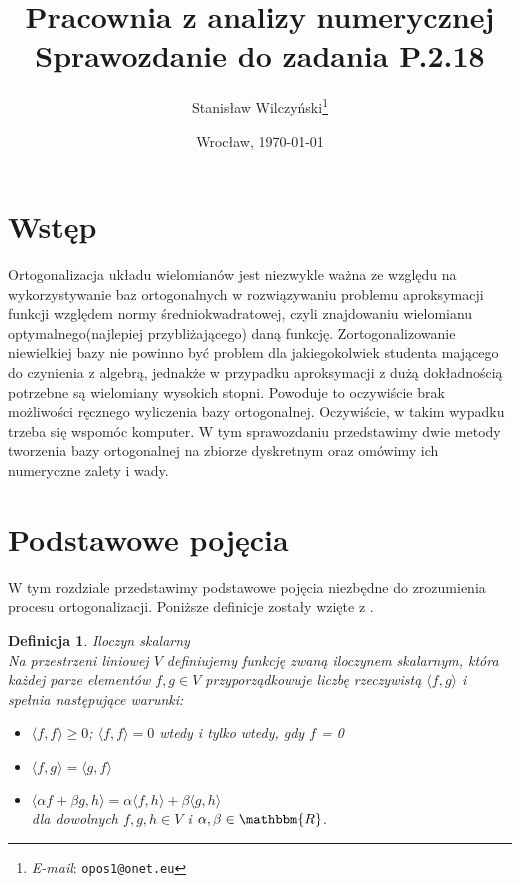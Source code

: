 \documentclass[12pt,wide]{mwart}
\date{Wrocław, \today}
\title{\LARGE\textbf{Pracownia z analizy numerycznej}\\ Sprawozdanie do zadania \textbf{P.2.18}}
\author{Stanisław Wilczyński\thanks{\textit{E-mail}: \texttt{opos1@onet.eu}}}
\newtheorem{defin}{Definicja}
\begin{document}
\maketitle                %
\thispagestyle{empty}     %
\tableofcontents          %

\section{Wstęp}

Ortogonalizacja układu wielomianów jest niezwykle ważna ze względu na wykorzystywanie baz ortogonalnych w rozwiązywaniu problemu aproksymacji funkcji względem normy średniokwadratowej, czyli znajdowaniu wielomianu optymalnego(najlepiej przybliżającego) daną funkcję. Zortogonalizowanie niewielkiej bazy nie powinno być problem dla jakiegokolwiek studenta mającego do czynienia z algebrą, jednakże w przypadku aproksymacji z dużą dokładnością potrzebne są wielomiany wysokich stopni. Powoduje to oczywiście brak możliwości ręcznego wyliczenia bazy ortogonalnej. Oczywiście, w takim wypadku trzeba się wspomóc komputer. W tym sprawozdaniu przedstawimy dwie metody tworzenia bazy ortogonalnej na zbiorze dyskretnym oraz omówimy ich numeryczne zalety i wady.

\section{Podstawowe pojęcia}
W tym rozdziale przedstawimy podstawowe pojęcia niezbędne do zrozumienia procesu ortogonalizacji. Poniższe definicje zostały wzięte z \cite{JMJ}.

\begin{defin}{Iloczyn skalarny}\\
Na przestrzeni liniowej $V$ definiujemy funkcję zwaną iloczynem skalarnym, która każdej parze elementów $f,g \in V$ przyporządkowuje liczbę rzeczywistą $\langle f,g \rangle$ i spełnia następujące warunki:
\begin{itemize}
	\item $\langle f,f \rangle \geq 0$; $\langle f,f \rangle = 0$ wtedy i tylko wtedy, gdy $f$ = 0
	\item $\langle f,g \rangle = \langle g,f \rangle$
	\item $\langle \alpha f + \beta g ,h \rangle = \alpha\langle f,h \rangle + \beta\langle g,h \rangle$\\
	dla dowolnych $f,g,h \in V$ i $\alpha,\beta \in \mathbbm{R}$.
\end{itemize} 
\end{defin}
\end{document}
